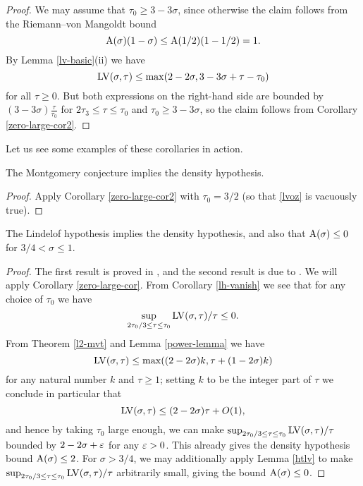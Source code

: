 \begin{proof}  We may assume that $\tau_0 \geq 3-3\sigma$, since otherwise the claim follows from the Riemann--von Mangoldt bound
    $$ \mathrm{A}(\sigma)(1-\sigma) \leq \mathrm{A}(1/2)(1-1/2) = 1.$$
    By Lemma \ref{lv-basic}(ii) we have
$$ \mathrm{LV}(\sigma,\tau) \leq \max( 2-2\sigma, 3-3\sigma + \tau - \tau_0 )$$
for all $\tau \geq 0$.  But both expressions on the right-hand side are bounded by $(3-3\sigma) \frac{\tau}{\tau_0}$ for $2\tau_3 \leq \tau \leq \tau_0$ and $\tau_0 \geq 3-3\sigma$, so the claim follows from Corollary \ref{zero-large-cor2}.
\end{proof}


Let us see some examples of these corollaries in action.

\begin{theorem}\label{montgomery_implies_density} The Montgomery conjecture implies the density hypothesis.
\end{theorem}

\begin{proof}  Apply Corollary \ref{zero-large-cor2} with $\tau_0=3/2$ (so that \eqref{lvoz} is vacuously true).
\end{proof}

\begin{theorem}\label{lindelof_implies_density} The Lindelof hypothesis implies the density hypothesis, and also that $\mathrm{A}(\sigma) \leq 0$ for $3/4 < \sigma \leq 1$.
\end{theorem}

\begin{proof} The first result is proved in \cite{ingham_estimation_1940}, and the second result is due to \cite{halasz_distribution_1969}. We will apply Corollary \ref{zero-large-cor}.  From Corollary \ref{lh-vanish} we see that for any choice of $\tau_0$ we have
$$ \sup_{2\tau_0/3 \leq \tau \leq \tau_0} \mathrm{LV}(\sigma,\tau)/\tau \leq 0.$$
From Theorem \ref{l2-mvt} and Lemma \ref{power-lemma} we have
\begin{equation}\label{ap}
     \mathrm{LV}(\sigma,\tau) \leq \max( (2-2\sigma)k, \tau + (1 - 2 \sigma)k )
\end{equation}
for any natural number $k$ and $\tau \geq 1$; setting $k$ to be the integer part of $\tau$ we conclude in particular that
$$ \mathrm{LV}(\sigma,\tau) \leq (2-2\sigma)\tau + O(1),$$
and hence by taking $\tau_0$ large enough, we can make
$\sup_{2\tau_0/3 \leq \tau \leq \tau_0} \mathrm{LV}(\sigma,\tau)/\tau$ bounded by $2-2\sigma + \varepsilon$ for any $\varepsilon>0$.  This already gives the density hypothesis bound $\mathrm{A}(\sigma) \leq 2$.  For $\sigma > 3/4$, we may additionally apply Lemma \ref{htlv} to make
$\sup_{2\tau_0/3 \leq \tau \leq \tau_0} \mathrm{LV}(\sigma,\tau)/\tau$ arbitrarily small, giving the bound $\mathrm{A}(\sigma) \leq 0$.
\end{proof}

